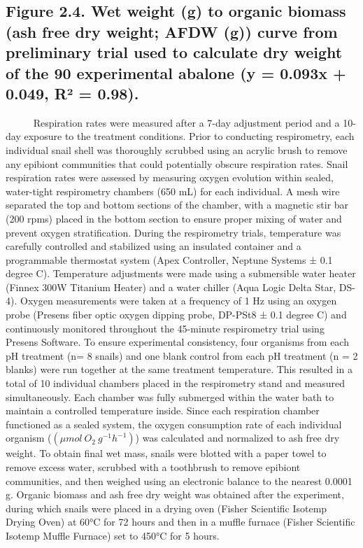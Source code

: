 \documentclass[
  12pt,
]{article}
\begin{document}
\hypertarget{figure-2.4.-wet-weight-g-to-organic-biomass-ash-free-dry-weight-afdw-g-curve-from-preliminary-trial-used-to-calculate-dry-weight-of-the-90-experimental-abalone-y-0.093x-0.049-ruxb2-0.98.}{%
\subsection{Figure 2.4. Wet weight (g) to organic biomass (ash free dry
weight; AFDW (g)) curve from preliminary trial used to calculate dry
weight of the 90 experimental abalone (y = 0.093x + 0.049, R² =
0.98).}\label{figure-2.4.-wet-weight-g-to-organic-biomass-ash-free-dry-weight-afdw-g-curve-from-preliminary-trial-used-to-calculate-dry-weight-of-the-90-experimental-abalone-y-0.093x-0.049-ruxb2-0.98.}}

~~~~~ Respiration rates were measured after a 7-day adjustment period
and a 10-day exposure to the treatment conditions. Prior to conducting
respirometry, each individual snail shell was thoroughly scrubbed using
an acrylic brush to remove any epibiont communities that could
potentially obscure respiration rates. Snail respiration rates were
assessed by measuring oxygen evolution within sealed, water-tight
respirometry chambers (650 mL) for each individual. A mesh wire
separated the top and bottom sections of the chamber, with a magnetic
stir bar (200 rpms) placed in the bottom section to ensure proper mixing
of water and prevent oxygen stratification. During the respirometry
trials, temperature was carefully controlled and stabilized using an
insulated container and a programmable thermostat system (Apex
Controller, Neptune Systems ± 0.1 degree C). Temperature adjustments
were made using a submersible water heater (Finnex 300W Titanium Heater)
and a water chiller (Aqua Logic Delta Star, DS-4). Oxygen measurements
were taken at a frequency of 1 Hz using an oxygen probe (Presens fiber
optic oxygen dipping probe, DP-PSt8 ± 0.1 degree C) and continuously
monitored throughout the 45-minute respirometry trial using Presens
Software. To ensure experimental consistency, four organisms from each
pH treatment (n= 8 snails) and one blank control from each pH treatment
(n = 2 blanks) were run together at the same treatment temperature. This
resulted in a total of 10 individual chambers placed in the respirometry
stand and measured simultaneously. Each chamber was fully submerged
within the water bath to maintain a controlled temperature inside. Since
each respiration chamber functioned as a sealed system, the oxygen
consumption rate of each individual organism
(\((\mu mol \: O_2 \: g^{-1}h^{-1})\)) was calculated and normalized to
ash free dry weight. To obtain final wet mass, snails were blotted with
a paper towel to remove excess water, scrubbed with a toothbrush to
remove epibiont communities, and then weighed using an electronic
balance to the nearest 0.0001 g. Organic biomass and ash free dry weight
was obtained after the experiment, during which snails were placed in a
drying oven (Fisher Scientific Isotemp Drying Oven) at 60°C for 72 hours
and then in a muffle furnace (Fisher Scientific Isotemp Muffle Furnace)
set to 450°C for 5 hours.
\end{document}
